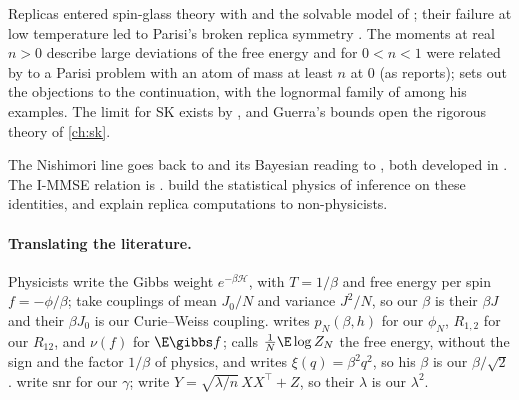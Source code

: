 \begin{refsection}
Replicas entered spin-glass theory with \textcite{EdwardsAnderson1975} and the solvable model of \textcite{SherringtonKirkpatrick1975}; their failure at low temperature led to Parisi's broken replica symmetry \parencite{Parisi1979b,MezardParisiVirasoro1987}. The moments at real $n>0$ describe large deviations of the free energy \parencite{ParisiRizzo2009} and for $0<n<1$ were related by \textcite{Talagrand2007} to a Parisi problem with an atom of mass at least $n$ at $0$ (as \textcite{Pei2026} reports); \textcite{Tanaka2007} sets out the objections to the continuation, with the lognormal family of \textcite{Heyde1963} among his examples. The limit for SK exists by \textcite{GuerraToninelli2002}, and Guerra's bounds \parencite{Guerra2003} open the rigorous theory of \cref{ch:sk}.

The Nishimori line goes back to \textcite{Nishimori1981} and its Bayesian reading to \textcite{Iba1999}, both developed in \textcite{Nishimori2001}. The I-MMSE relation is \textcite{GuoShamaiVerdu2005}. \Textcite{ZdeborovaKrzakala2016} build the statistical physics of inference on these identities, and \textcite{MontanariSen2024} explain replica computations to non-physicists.

\paragraph{Translating the literature.} Physicists write the Gibbs weight $e^{-\beta\mathcal H}$, with $T=1/\beta$ and free energy per spin $f=-\phi/\beta$; \textcite{SherringtonKirkpatrick1975} take couplings of mean $J_0/N$ and variance $J^2/N$, so our $\beta$ is their $\beta J$ and their $\beta J_0$ is our Curie--Weiss coupling. \Textcite{Talagrand2011a} writes $p_N(\beta,h)$ for our $\phi_N$, $R_{1,2}$ for our $R_{12}$, and $\nu(f)$ for $\E\gibbs f$; \textcite{Panchenko2013b} calls $\frac1N\E\log Z_N$ the free energy, without the sign and the factor $1/\beta$ of physics, and writes $\xi(q)=\beta^2q^2$, so his $\beta$ is our $\beta/\sqrt2$. \Textcite{GuoShamaiVerdu2005} write $\mathrm{snr}$ for our $\gamma$; \textcite{LelargeMiolane2019} write $Y=\sqrt{\lambda/n}\,XX^\top+Z$, so their $\lambda$ is our $\lambda^2$.

\printchapterbib
\end{refsection}
